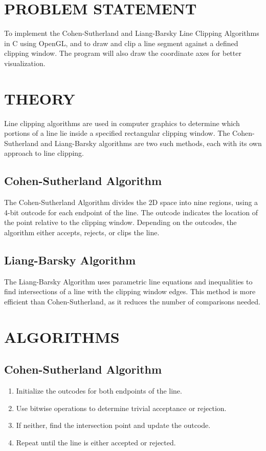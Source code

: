 \documentclass{article}
\begin{document}
\section*{PROBLEM STATEMENT}
To implement the Cohen-Sutherland and Liang-Barsky Line Clipping Algorithms in C using OpenGL, and to draw and clip a line segment against a defined clipping window. The program will also draw the coordinate axes for better visualization.

\section*{THEORY}
Line clipping algorithms are used in computer graphics to determine which portions of a line lie inside a specified rectangular clipping window. The Cohen-Sutherland and Liang-Barsky algorithms are two such methods, each with its own approach to line clipping.

\subsection*{Cohen-Sutherland Algorithm}
The Cohen-Sutherland Algorithm divides the 2D space into nine regions, using a 4-bit outcode for each endpoint of the line. The outcode indicates the location of the point relative to the clipping window. Depending on the outcodes, the algorithm either accepts, rejects, or clips the line.

\subsection*{Liang-Barsky Algorithm}
The Liang-Barsky Algorithm uses parametric line equations and inequalities to find intersections of a line with the clipping window edges. This method is more efficient than Cohen-Sutherland, as it reduces the number of comparisons needed.

\section*{ALGORITHMS}

\subsection*{Cohen-Sutherland Algorithm}
\begin{enumerate}
    \item Initialize the outcodes for both endpoints of the line.
    \item Use bitwise operations to determine trivial acceptance or rejection.
    \item If neither, find the intersection point and update the outcode.
    \item Repeat until the line is either accepted or rejected.
\end{enumerate}
\end{document}
